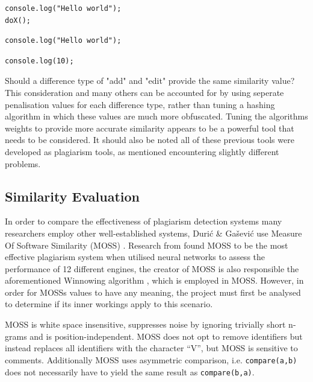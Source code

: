 \documentclass[jou,apacite]{apa6}
\begin{document}
\begin{lstlisting}[caption=Difference type add - B]
console.log("Hello world");
doX();
\end{lstlisting}

\begin{lstlisting}[caption=Difference type edit - A]
console.log("Hello world");
\end{lstlisting}

\begin{lstlisting}[caption=Difference type edit - B]
console.log(10);
\end{lstlisting}

Should a difference type of "add" and "edit" provide the same similarity value? This consideration and many others can be accounted for by using seperate penalisation values for each difference type, rather than tuning a hashing algorithm in which these values are much more obfuscated. Tuning the algorithms weights to provide more accurate similarity appears to be a powerful tool that needs to be considered. It should also be noted all of these previous tools were developed as plagiarism tools, as mentioned encountering slightly different problems. 
\subsection{Similarity Evaluation}

In order to compare the effectiveness of plagiarism detection systems many researchers employ other well-established systems, Duri\'{c} \& Ga\v{s}evi\'{c} use Measure Of Software Similarity (MOSS) \cite{aiken1994}. Research from \cite{Engels2007} found MOSS to be the most effective plagiarism system when utilised neural networks to assess the performance of 12 different engines, the creator of MOSS is  also responsible the aforementioned Winnowing algorithm \cite{Schleimer2003}, which is employed in MOSS. However, in order for MOSS\textquotesingle s values to have any meaning, the project must first be analysed to determine if it\textquotesingle s inner workings apply to this scenario.

MOSS is white space insensitive, suppresses noise by ignoring trivially short n-grams and is position-independent. MOSS does not opt to remove identifiers but instead replaces all identifiers with the character \textquotedblleft{}V\textquotedblright{}, but MOSS is sensitive to comments. Additionally MOSS uses asymmetric comparison, i.e. \texttt{compare(a,b)} does not necessarily have to yield the same result as \texttt{compare(b,a)}. 
\end{document}
